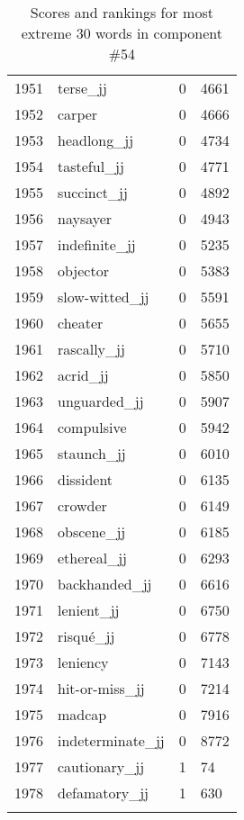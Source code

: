 \begin{longtable}[!htbp]{| rlr@{.}l |}
    1951 & terse\_jj & 0 & 4661 \\
    1952 & carper & 0 & 4666 \\
    1953 & headlong\_jj & 0 & 4734 \\
    1954 & tasteful\_jj & 0 & 4771 \\
    1955 & succinct\_jj & 0 & 4892 \\
    1956 & naysayer & 0 & 4943 \\
    1957 & indefinite\_jj & 0 & 5235 \\
    1958 & objector & 0 & 5383 \\
    1959 & slow-witted\_jj & 0 & 5591 \\
    1960 & cheater & 0 & 5655 \\
    1961 & rascally\_jj & 0 & 5710 \\
    1962 & acrid\_jj & 0 & 5850 \\
    1963 & unguarded\_jj & 0 & 5907 \\
    1964 & compulsive & 0 & 5942 \\
    1965 & staunch\_jj & 0 & 6010 \\
    1966 & dissident & 0 & 6135 \\
    1967 & crowder & 0 & 6149 \\
    1968 & obscene\_jj & 0 & 6185 \\
    1969 & ethereal\_jj & 0 & 6293 \\
    1970 & backhanded\_jj & 0 & 6616 \\
    1971 & lenient\_jj & 0 & 6750 \\
    1972 & risqué\_jj & 0 & 6778 \\
    1973 & leniency & 0 & 7143 \\
    1974 & hit-or-miss\_jj & 0 & 7214 \\
    1975 & madcap & 0 & 7916 \\
    1976 & indeterminate\_jj & 0 & 8772 \\
    1977 & cautionary\_jj & 1 & 74 \\
    1978 & defamatory\_jj & 1 & 630 \\
    \hline
    \caption{Scores and rankings for most extreme 30 words in component \#54} \\
\end{longtable}
